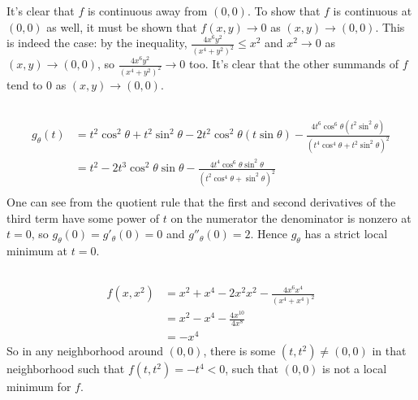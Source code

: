 \documentclass[12pt]{article}
\begin{document}
It's clear that $f$ is continuous away from $(0, 0)$. 
To show that $f$ is continuous at $(0, 0)$ as well, it must be shown that $f(x, y) \rightarrow 0$ as $(x, y) \rightarrow (0, 0)$. 
This is indeed the case: 
by the inequality, 
$\frac{4x^6 y^2}{(x^4 + y^2)^2} \leq x^2$ and $x^2 \rightarrow 0$ as $(x, y) \rightarrow (0, 0)$, so $\frac{4x^6 y^2}{(x^4 + y^2)^2} \rightarrow 0$ too. 
It's clear that the other summands of $f$ tend to $0$ as $(x, y) \rightarrow (0, 0)$. 
 
\subsection{}
\begin{align*}
  g_{\theta}(t) & = t^2 \cos^{2}{\theta} + t^2 \sin^{2}{\theta} - 2t^2 \cos^{2}{\theta} (t\sin{\theta}) - \frac{4t^{6} \cos^{6}{\theta} (t^2 \sin^{2}{\theta})}{(t^4 \cos^{4}\theta + t^2 \sin^{2}{\theta})^2} \\ 
                & = t^2 - 2t^3 \cos^{2}{\theta} \sin{\theta} - \frac{4t^4 \cos^{6}{\theta}\sin^{2}{\theta}}{(t^2 \cos^{4}{\theta} + \sin^{2}{\theta})^{2}} \\ 
\end{align*}
One can see from the quotient rule that the first and second derivatives of the third term have some power of $t$ on the numerator the denominator is nonzero at $t = 0$, so 
$g_{\theta}(0) = g'_{\theta}(0) = 0$ and $g''_{\theta}(0) = 2$. 
Hence $g_{\theta}$ has a strict local minimum at $t = 0$. 

\subsection{}
\begin{align*}
  f(x, x^2) & = x^2 + x^4 - 2x^2 x^2 - \frac{4x^6 x^4}{(x^4 + x^4)^2} \\ 
            & = x^2 - x^4 - \frac{4x^{10}}{4x^8} \\ 
            & = -x^4
\end{align*}
So in any neighborhood around $(0, 0)$, there is some $(t, t^2) \neq (0, 0)$ in that neighborhood such that $f(t, t^2) = -t^4 < 0$, such that $(0, 0)$ is not a local minimum for $f$. 
\end{document}
